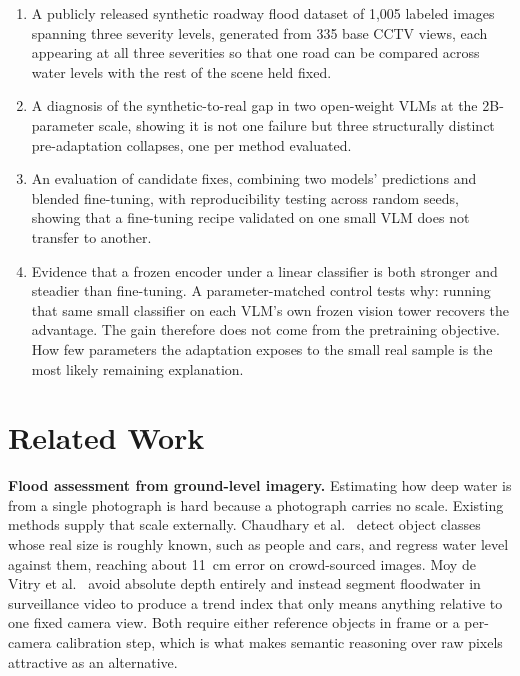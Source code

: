 \documentclass[conference]{IEEEtran}
\begin{document}
\begin{enumerate}
\item A publicly released synthetic roadway flood dataset of 1{,}005 labeled images spanning three severity levels, generated from 335 base CCTV views, each appearing at all three severities so that one road can be compared across water levels with the rest of the scene held fixed.
\item A diagnosis of the synthetic-to-real gap in two open-weight VLMs at the 2B-parameter scale, showing it is not one failure but three structurally distinct pre-adaptation collapses, one per method evaluated.
\item An evaluation of candidate fixes, combining two models' predictions and blended fine-tuning, with reproducibility testing across random seeds, showing that a fine-tuning recipe validated on one small VLM does not transfer to another.
\item Evidence that a frozen encoder under a linear classifier is both stronger and steadier than fine-tuning. A parameter-matched control tests why: running that same small classifier on each VLM's own frozen vision tower recovers the advantage. The gain therefore does not come from the pretraining objective. How few parameters the adaptation exposes to the small real sample is the most likely remaining explanation.
\end{enumerate}

\section{Related Work}

\textbf{Flood assessment from ground-level imagery.} Estimating how deep water is from a single photograph is hard because a photograph carries no scale. Existing methods supply that scale externally. Chaudhary et al.~\cite{chaudhary2020water} detect object classes whose real size is roughly known, such as people and cars, and regress water level against them, reaching about 11~cm error on crowd-sourced images. Moy de Vitry et al.~\cite{moydevitry2019scalable} avoid absolute depth entirely and instead segment floodwater in surveillance video to produce a trend index that only means anything relative to one fixed camera view. Both require either reference objects in frame or a per-camera calibration step, which is what makes semantic reasoning over raw pixels attractive as an alternative.
\end{document}
